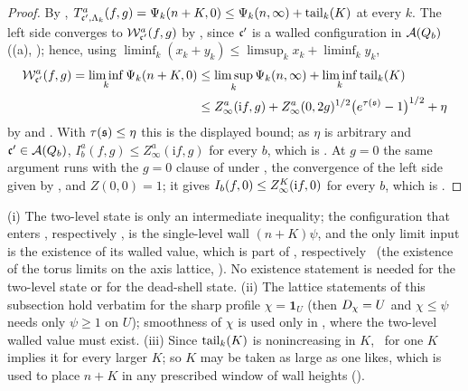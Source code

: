 \begin{proof}
By , $T^{a}_{\mathfrak c',\Lambda_k}(f,g)=\Psi_k(n+K,0)\le\Psi_k(n,\infty)+\operatorname{tail}_k(K)$ at every $k$. The left side converges to $\mathcal W^a_{\mathfrak c'}(f,g)$ by \Ka, since $\mathfrak c'$ is a walled configuration in $\mathcal A(Q_{b})$ ((a), ); hence, using $\liminf_k(x_k+y_k)\le\limsup_kx_k+\liminf_ky_k$,
\begin{align*}
\mathcal W^a_{\mathfrak c'}(f,g)=\liminf_k\Psi_k(n+K,0)&\le\limsup_k\Psi_k(n,\infty)+\liminf_k\operatorname{tail}_k(K)\\
&\le Z^a_\infty(\mathrm if,g)+Z^a_\infty(0,2g)^{1/2}\big(e^{\tau(\mathfrak s)}-1\big)^{1/2}+\eta
\end{align*}
by  and \REa. With $\tau(\mathfrak s)\le\eta$ this is the displayed bound; as $\eta$ is arbitrary and $\mathfrak c'\in\mathcal A(Q_{b})$, $I^a_b(f,g)\le Z^a_\infty(\mathrm if,g)$ for every $b$, which is \TIa. At $g=0$ the same argument runs with the $g=0$ clause of  under \EC, the convergence of the left side given by \Kz, and $Z(0,0)=1$; it gives $I_b(f,0)\le Z^{K}_{\infty}(\mathrm if,0)$ for every $b$, which is \TIz.
\end{proof}

\begin{remark}\label{rot:rem:Eproof}
(i) The two-level state is only an intermediate inequality; the configuration that enters \TIa, respectively \TIz, is the single-level wall $(n+K)\psi$, and the only limit input is the existence of its walled value, which is part of \Ka, respectively \Kz\ (the existence of the torus limits on the axis lattice, ). No existence statement is needed for the two-level state or for the dead-shell state. (ii) The lattice statements of this subsection hold verbatim for the sharp profile $\chi=\mathbf 1_U$ (then $D_\chi=U$ and $\chi\le\psi$ needs only $\psi\ge1$ on $U$); smoothness of $\chi$ is used only in , where the two-level walled value must exist. (iii) Since $\operatorname{tail}_k(K)$ is nonincreasing in $K$, \REa\ for one $K$ implies it for every larger $K$; so $K$ may be taken as large as one likes, which is used to place $n+K$ in any prescribed window of wall heights ().
\end{remark}
